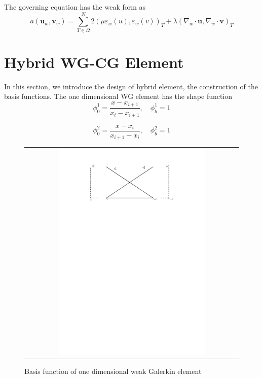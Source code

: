 The governing equation has the weak form as
\begin{equation}
a(\mathbf{u}_{w}, \mathbf{v}_{w}) = \sum_{T \in \Omega}^{N} 2(\mu \varepsilon_w (u), \varepsilon_{w} (v))_{T} + \lambda(\nabla_{w} \cdot \mathbf{u}, \nabla_{w} \cdot \mathbf{v})_{T}
\end{equation}

\section{Hybrid WG-CG Element}

In this section, we introduce the design of hybrid element, the construction of the basis functions. The one dimensional WG element has the shape function
\begin{equation}
\phi_{0}^{1} = \frac{x - x_{i +1}}{x_{i} - x_{i +1}}, \quad \phi_{b}^{1} = 1
\end{equation}

\begin{equation}
\phi_{0}^{2} = \frac{x - x_{i}}{x_{i + 1} - x_{i}}, \quad \phi_{b}^{2} = 1
\end{equation}

\begin{figure}[H]
	\centering
	\begin{tabular}{c}
		\includegraphics[width=0.7\textwidth]{./pics/oneD}
	\end{tabular}
	\caption{\footnotesize Basis function of one dimensional weak Galerkin element}
\end{figure}

